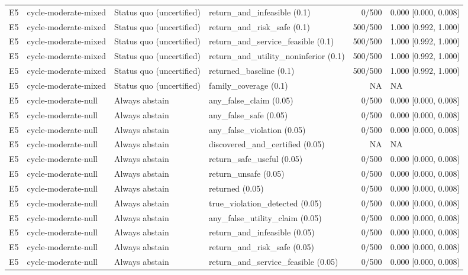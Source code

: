 \begin{longtable}{p{.04\linewidth}p{.18\linewidth}p{.19\linewidth}p{.16\linewidth}r p{.21\linewidth}}
E5 & cycle-moderate-mixed & Status quo (uncertified) & return\_and\_infeasible (0.1) & 0/500 & 0.000 [0.000, 0.008]\\
E5 & cycle-moderate-mixed & Status quo (uncertified) & return\_and\_risk\_safe (0.1) & 500/500 & 1.000 [0.992, 1.000]\\
E5 & cycle-moderate-mixed & Status quo (uncertified) & return\_and\_service\_feasible (0.1) & 500/500 & 1.000 [0.992, 1.000]\\
E5 & cycle-moderate-mixed & Status quo (uncertified) & return\_and\_utility\_noninferior (0.1) & 500/500 & 1.000 [0.992, 1.000]\\
E5 & cycle-moderate-mixed & Status quo (uncertified) & returned\_baseline (0.1) & 500/500 & 1.000 [0.992, 1.000]\\
E5 & cycle-moderate-mixed & Status quo (uncertified) & family\_coverage (0.1) & NA & NA\\
E5 & cycle-moderate-null & Always abstain & any\_false\_claim (0.05) & 0/500 & 0.000 [0.000, 0.008]\\
E5 & cycle-moderate-null & Always abstain & any\_false\_safe (0.05) & 0/500 & 0.000 [0.000, 0.008]\\
E5 & cycle-moderate-null & Always abstain & any\_false\_violation (0.05) & 0/500 & 0.000 [0.000, 0.008]\\
E5 & cycle-moderate-null & Always abstain & discovered\_and\_certified (0.05) & NA & NA\\
E5 & cycle-moderate-null & Always abstain & return\_safe\_useful (0.05) & 0/500 & 0.000 [0.000, 0.008]\\
E5 & cycle-moderate-null & Always abstain & return\_unsafe (0.05) & 0/500 & 0.000 [0.000, 0.008]\\
E5 & cycle-moderate-null & Always abstain & returned (0.05) & 0/500 & 0.000 [0.000, 0.008]\\
E5 & cycle-moderate-null & Always abstain & true\_violation\_detected (0.05) & 0/500 & 0.000 [0.000, 0.008]\\
E5 & cycle-moderate-null & Always abstain & any\_false\_utility\_claim (0.05) & 0/500 & 0.000 [0.000, 0.008]\\
E5 & cycle-moderate-null & Always abstain & return\_and\_infeasible (0.05) & 0/500 & 0.000 [0.000, 0.008]\\
E5 & cycle-moderate-null & Always abstain & return\_and\_risk\_safe (0.05) & 0/500 & 0.000 [0.000, 0.008]\\
E5 & cycle-moderate-null & Always abstain & return\_and\_service\_feasible (0.05) & 0/500 & 0.000 [0.000, 0.008]\\

\end{longtable}
